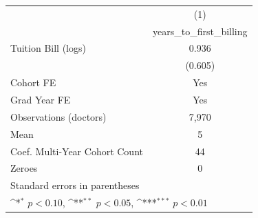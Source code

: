 {
\def\sym#1{\ifmmode^{#1}\else\(^{#1}\)\fi}
\begin{tabular}{l*{1}{c}}
\hline\hline
                    &\multicolumn{1}{c}{(1)}\\
                    &\multicolumn{1}{c}{years\_to\_first\_billing}\\
\hline
Tuition Bill (logs) &       0.936         \\
                    &     (0.605)         \\
[1em]
Cohort FE           &         Yes         \\
[1em]
Grad Year FE        &         Yes         \\
\hline
Observations (doctors)&       7,970         \\
Mean                &           5         \\
Coef. %
Multi-Year Cohort Count&          44         \\
Zeroes              &           0         \\
\hline\hline
\multicolumn{2}{l}{\footnotesize Standard errors in parentheses}\\
\multicolumn{2}{l}{\footnotesize \sym{*} \(p<0.10\), \sym{**} \(p<0.05\), \sym{***} \(p<0.01\)}\\
\end{tabular}
}
